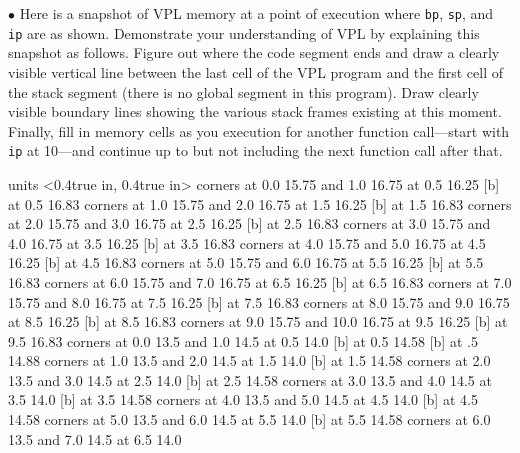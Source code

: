 \vfil\eject

\item{$\bullet$}
Here is a snapshot of VPL memory at a point of execution where {\tt bp}, {\tt sp},
and
{\tt ip} are as shown.  Demonstrate your 
understanding of VPL by explaining this snapshot as follows.
Figure out where the code segment ends and draw a clearly visible vertical line
between the last cell of the VPL program and the first cell of the stack segment (there is
no global segment in this program).
Draw clearly visible boundary lines showing the various stack frames existing at
this moment.  Finally, fill in memory cells as you
execution for another function call---start with
{\tt ip} at 10---and continue up to but not including the next function call after that.
\medskip

\beginpicture
\setcoordinatesystem units <0.4true in, 0.4true in>
\putrectangle corners at 0.0 15.75 and 1.0 16.75
 at 0.5 16.25
 [b] at 0.5 16.83
\putrectangle corners at 1.0 15.75 and 2.0 16.75
 at 1.5 16.25
 [b] at 1.5 16.83
\putrectangle corners at 2.0 15.75 and 3.0 16.75
 at 2.5 16.25
 [b] at 2.5 16.83
\putrectangle corners at 3.0 15.75 and 4.0 16.75
 at 3.5 16.25
 [b] at 3.5 16.83
\putrectangle corners at 4.0 15.75 and 5.0 16.75
 at 4.5 16.25
 [b] at 4.5 16.83
\putrectangle corners at 5.0 15.75 and 6.0 16.75
 at 5.5 16.25
 [b] at 5.5 16.83
\putrectangle corners at 6.0 15.75 and 7.0 16.75
 at 6.5 16.25
 [b] at 6.5 16.83
\putrectangle corners at 7.0 15.75 and 8.0 16.75
 at 7.5 16.25
 [b] at 7.5 16.83
\putrectangle corners at 8.0 15.75 and 9.0 16.75
 at 8.5 16.25
 [b] at 8.5 16.83
\putrectangle corners at 9.0 15.75 and 10.0 16.75
 at 9.5 16.25
 [b] at 9.5 16.83
\putrectangle corners at 0.0 13.5 and 1.0 14.5
 at 0.5 14.0
 [b] at 0.5 14.58
 [b] at .5 14.88
\putrectangle corners at 1.0 13.5 and 2.0 14.5
 at 1.5 14.0
 [b] at 1.5 14.58
\putrectangle corners at 2.0 13.5 and 3.0 14.5
 at 2.5 14.0
 [b] at 2.5 14.58
\putrectangle corners at 3.0 13.5 and 4.0 14.5
 at 3.5 14.0
 [b] at 3.5 14.58
\putrectangle corners at 4.0 13.5 and 5.0 14.5
 at 4.5 14.0
 [b] at 4.5 14.58
\putrectangle corners at 5.0 13.5 and 6.0 14.5
 at 5.5 14.0
 [b] at 5.5 14.58
\putrectangle corners at 6.0 13.5 and 7.0 14.5
 at 6.5 14.0

